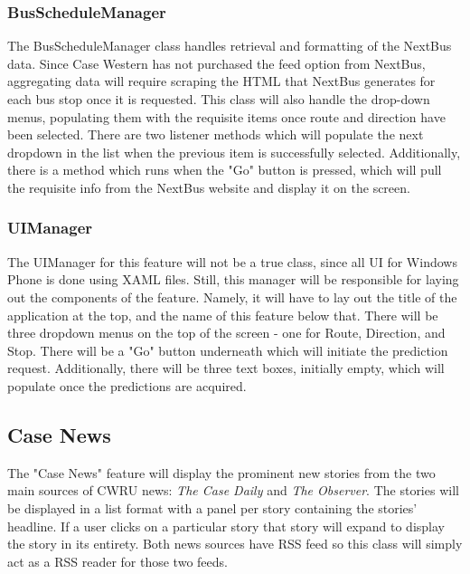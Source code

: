 \documentclass[pdftex,12pt,letter]{article}
\begin{document}
\subsubsection{BusScheduleManager}
The BusScheduleManager class handles retrieval and formatting of the NextBus data. Since Case Western has not purchased the feed option from NextBus, aggregating data will require scraping the HTML that NextBus generates for each bus stop once it is requested. This class will also handle the drop-down menus, populating them with the requisite items once route and direction have been selected. There are two listener methods which will populate the next dropdown in the list when the previous item is successfully selected. Additionally, there is a method which runs when the "Go" button is pressed, which will pull the requisite info from the NextBus website and display it on the screen.
\subsubsection{UIManager}
The UIManager for this feature will not be a true class, since all UI for Windows Phone is done using XAML files. Still, this manager will be responsible for laying out the components of the feature. Namely, it will have to lay out the title of the application at the top, and the name of this feature below that. There will be three dropdown menus on the top of the screen - one for Route, Direction, and Stop. There will be a "Go" button underneath which will initiate the prediction request. Additionally, there will be three text boxes, initially empty, which will populate once the predictions are acquired.
\subsection{Case News}
The "Case News" feature will display the prominent new stories from the
two main sources of CWRU news: \emph{The Case Daily} and \emph{The Observer}. The
stories will be displayed in a list format with a panel per story containing the
stories' headline. If a user clicks on a particular story that story will expand
to display the story in its entirety. Both news sources have RSS feed so this
class will simply act as a RSS reader for those two feeds.
\end{document}
